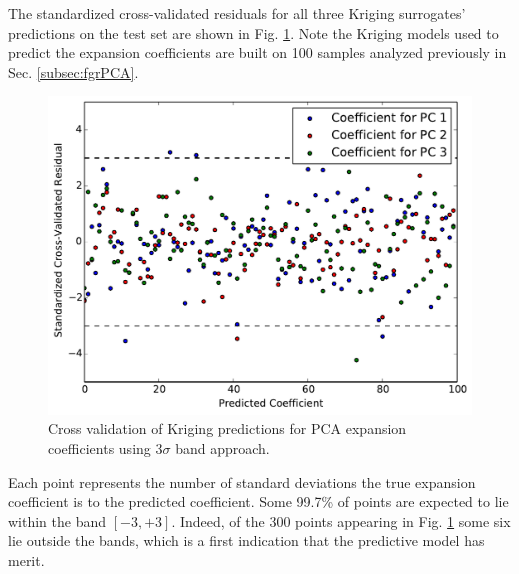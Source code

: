 The standardized cross-validated residuals for all three Kriging surrogates' predictions on the test set are shown in Fig. \ref{fig:xval_3sig_bands}. Note the Kriging models used to predict the expansion coefficients are built on 100 samples analyzed previously in Sec. \ref{subsec:fgrPCA}.  
\begin{figure}
\caption{\label{fig:xval_3sig_bands}
Cross validation of Kriging predictions for \ac{PCA} expansion coefficients using 3$\sigma$ band approach.}
 \begin{center}
  \includegraphics[scale=.75]{./Chapter4/xval_3sig_band.pdf}
 \end{center}
\end{figure}
Each point represents the number of standard deviations the true expansion coefficient is to the predicted coefficient. Some 99.7\% of points are expected to lie within the band $\left[-3, +3\right]$. Indeed, of the 300 points appearing in Fig. \ref{fig:xval_3sig_bands} some six lie outside the bands, which is a first indication that the predictive model has merit.  

